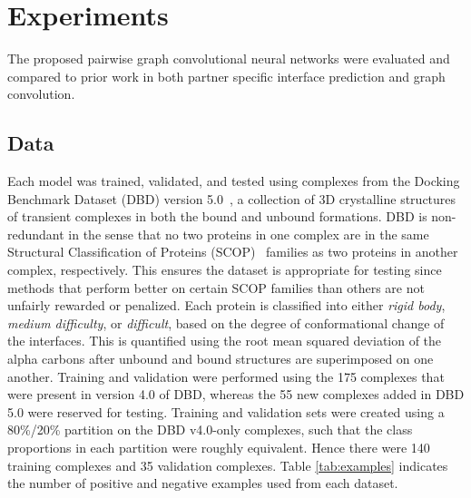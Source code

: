 \chapter{Experiments}
\label{chap:experiments}

The proposed pairwise graph convolutional neural networks were evaluated and compared to prior work in both partner specific interface prediction and graph convolution.

\section{Data}

Each model was trained, validated, and tested using complexes from the Docking Benchmark Dataset (DBD) version 5.0~\cite{vreven2015}, a collection of 3D crystalline structures of transient complexes in both the bound and unbound formations. 
DBD is non-redundant in the sense that no two proteins in one complex are in the same Structural Classification of Proteins (SCOP)~\cite{murzin1995} families as two proteins in another complex, respectively.
This ensures the dataset is appropriate for testing since methods that perform better on certain SCOP families than others are not unfairly rewarded or penalized.
Each protein is classified into either \emph{rigid body}, \emph{medium difficulty}, or \emph{difficult}, based on the degree of conformational change of the interfaces.
This is quantified using the root mean squared deviation of the alpha carbons after unbound and bound structures are superimposed on one another. 
Training and validation were performed using the 175 complexes that were present in version 4.0 of DBD, whereas the 55 new complexes added in DBD 5.0 were reserved for testing. 
Training and validation sets were created using a 80\%/20\% partition on the DBD v4.0-only complexes, such that the class proportions in each partition were roughly equivalent.
Hence there were 140 training complexes and 35 validation complexes.
Table \ref{tab:examples} indicates the number of positive and negative examples used from each dataset.

